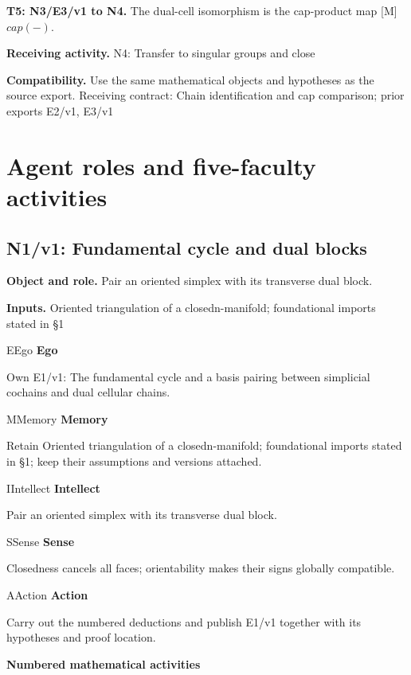 \documentclass[preprint,12pt,aps,pra,showkeys,amsmath,amssymb,superscriptaddress,floatfix]{revtex4-2}
\theoremstyle{definition}
\theoremstyle{remark}
\newcommand{\mmfaculty}[3]{%
 \begin{mmfacultybox}{#1}{#2}
 {\sffamily\bfseries\color{MMBlue}#2}\par\smallskip #3
 \end{mmfacultybox}}
\newcommand{\field}[2]{\par\smallskip\noindent\textbf{#1.} #2\par}
\begin{document}
\field{T5: N3/E3/v1 to N4}{The dual-cell isomorphism is the cap-product map {[}M{]} \(cap(-)\).}

\field{Receiving activity}{N4: Transfer to singular groups and close}

\field{Compatibility}{Use the same mathematical objects and hypotheses as the source export.
Receiving contract: Chain identification and cap comparison; prior
exports E2/v1, E3/v1}

\endgroup

\clearpage\section{Agent roles and five-faculty activities}\begingroup\small\linespread{1.05}\selectfont{}

\subsection{N1/v1: Fundamental cycle and dual blocks}

\field{Object and role}{Pair an oriented simplex with its transverse dual block.}

\field{Inputs}{Oriented triangulation of a closedn-manifold; foundational imports
stated in §1}

\mmfaculty{E}{Ego}{Own E1/v1: The fundamental cycle and a basis pairing between simplicial
cochains and dual cellular chains.}

\mmfaculty{M}{Memory}{Retain Oriented triangulation of a closedn-manifold; foundational
imports stated in §1; keep their assumptions and versions attached.}

\mmfaculty{I}{Intellect}{Pair an oriented simplex with its transverse dual block.}

\mmfaculty{S}{Sense}{Closedness cancels all faces; orientability makes their signs globally
compatible.}

\mmfaculty{A}{Action}{Carry out the numbered deductions and publish E1/v1 together with its
hypotheses and proof location.}

\smallskip\noindent\textbf{Numbered mathematical activities}
\end{document}
